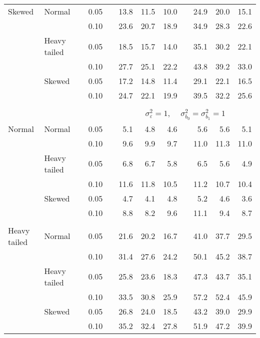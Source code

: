 \begin{table}[ht]
\begin{scriptsize}
\begin{center}
\begin{tabular}{ll p{.1cm} c p{.1cm} rrr p{.1cm} rrr}
Skewed       & Normal       && 0.05 &&   13.8 & 11.5 & 10.0 &   & 24.9 & 20.0 & 15.1 \\ 
             &              && 0.10 &&   23.6 & 20.7 & 18.9 &   & 34.9 & 28.3 & 22.6 \\ 
             & Heavy tailed && 0.05 &&   18.5 & 15.7 & 14.0 &   & 35.1 & 30.2 & 22.1 \\ 
             &              && 0.10 &&   27.7 & 25.1 & 22.2 &   & 43.8 & 39.2 & 33.0 \\ 
             & Skewed       && 0.05 &&   17.2 & 14.8 & 11.4 &   & 29.1 & 22.1 & 16.5 \\ 
             &              && 0.10 &&   24.7 & 22.1 & 19.9 &   & 39.5 & 32.2 & 25.6 \\ 

&&&&&&&&&&&\\
& && && \multicolumn{7}{c}{$\sigma_{\varepsilon}^2 = 1$, \ \ $\sigma_{b_0}^2 = \sigma_{b_1}^2 = 1$} \\ \cline{6-12}
\rowcolor{gray!20}Normal       & Normal       && 0.05 &&   5.1 & 4.8 & 4.6 &   & 5.6 & 5.6 & 5.1 \\ 
\rowcolor{gray!20}             &              && 0.10 &&   9.6 & 9.9 & 9.7 &   & 11.0 & 11.3 & 11.0 \\ 
\rowcolor{gray!20}             & Heavy tailed && 0.05 &&   6.8 & 6.7 & 5.8 &   & 6.5 & 5.6 & 4.9 \\ 
\rowcolor{gray!20}             &              && 0.10 &&   11.6 & 11.8 & 10.5 &   & 11.2 & 10.7 & 10.4 \\ 
\rowcolor{gray!20}             & Skewed       && 0.05 &&   4.7 & 4.1 & 4.8 &   & 5.2 & 4.6 & 3.6 \\ 
\rowcolor{gray!20}             &              && 0.10 &&   8.8 & 8.2 & 9.6 &   & 11.1 & 9.4 & 8.7 \\ 
&&&&&&&&&&&\\
Heavy tailed & Normal       && 0.05 &&   21.6 & 20.2 & 16.7 &   & 41.0 & 37.7 & 29.5 \\ 
             &              && 0.10 &&   31.4 & 27.6 & 24.2 &   & 50.1 & 45.2 & 38.7 \\ 
             & Heavy tailed && 0.05 &&   25.8 & 23.6 & 18.3 &   & 47.3 & 43.7 & 35.1 \\ 
             &              && 0.10 &&   33.5 & 30.8 & 25.9 &   & 57.2 & 52.4 & 45.9 \\ 
             & Skewed       && 0.05 &&   26.8 & 24.0 & 18.5 &   & 43.2 & 39.0 & 29.9 \\ 
             &              && 0.10 &&   35.2 & 32.4 & 27.8 &   & 51.9 & 47.2 & 39.9 \\ 

\end{tabular}
\end{center}
\end{scriptsize}
\end{table}
